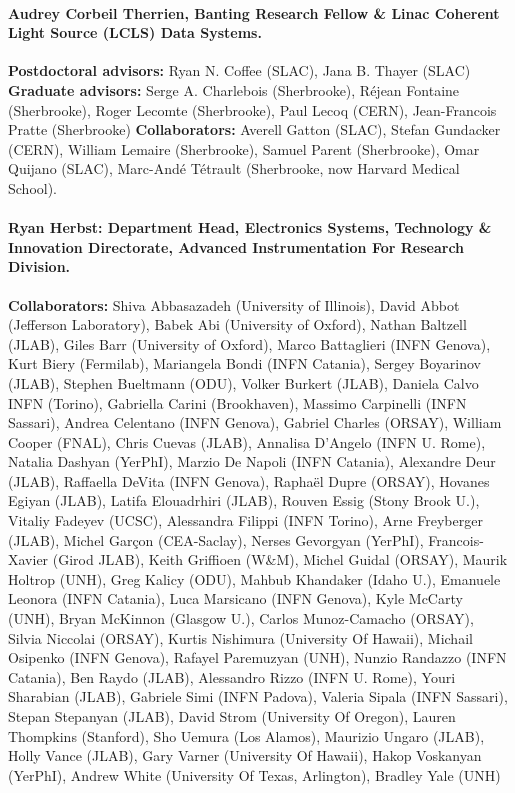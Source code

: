 \documentclass{article}
\begin{document}
\paragraph{Audrey Corbeil Therrien, Banting Research Fellow \& Linac Coherent Light Source (LCLS) Data Systems. }
\textbf{Postdoctoral advisors: } Ryan N. Coffee (SLAC), Jana B. Thayer (SLAC)
\textbf{Graduate advisors: } Serge A. Charlebois (Sherbrooke), R\'{e}jean Fontaine (Sherbrooke), Roger Lecomte (Sherbrooke), Paul Lecoq (CERN), Jean-Francois Pratte (Sherbrooke) 
\textbf{Collaborators: }
Averell Gatton (SLAC), Stefan Gundacker (CERN), William Lemaire (Sherbrooke), Samuel Parent (Sherbrooke), Omar Quijano (SLAC), Marc-And\'{e} T\'{e}trault (Sherbrooke, now Harvard Medical School).

\paragraph{Ryan Herbst: Department Head, Electronics Systems, Technology \& Innovation Directorate, Advanced Instrumentation For Research Division. }
\textbf{Collaborators: }
Shiva Abbasazadeh (University of Illinois), David	Abbot	(Jefferson Laboratory), Babek	Abi	(University of Oxford), Nathan	Baltzell	(JLAB), Giles	Barr	(University of Oxford), Marco	Battaglieri	(INFN Genova), Kurt	Biery	(Fermilab), Mariangela	Bondi	(INFN Catania), Sergey	Boyarinov	(JLAB), Stephen	Bueltmann	(ODU), Volker	Burkert	(JLAB), Daniela	Calvo	INFN (Torino), Gabriella	Carini	(Brookhaven), Massimo	Carpinelli	(INFN Sassari), Andrea	Celentano	(INFN Genova), Gabriel	Charles	(ORSAY), William	Cooper	(FNAL), Chris	Cuevas	(JLAB), Annalisa	D'Angelo	(INFN U. Rome), Natalia	Dashyan	(YerPhI), Marzio	De Napoli	(INFN Catania), Alexandre	Deur	(JLAB), Raffaella	DeVita	(INFN Genova), Raphaël	Dupre	(ORSAY), Hovanes	Egiyan	(JLAB), Latifa	Elouadrhiri	(JLAB), Rouven	Essig	(Stony Brook U.), Vitaliy	Fadeyev	(UCSC), Alessandra	Filippi	(INFN Torino), Arne	Freyberger	(JLAB), Michel	Garçon	(CEA-Saclay), Nerses	Gevorgyan	(YerPhI), Francois-Xavier	(Girod	JLAB), Keith	Griffioen	(W\&M), Michel	Guidal	(ORSAY), Maurik	Holtrop	(UNH), Greg	Kalicy	(ODU), Mahbub	Khandaker	(Idaho U.), Emanuele	Leonora	(INFN Catania), Luca	Marsicano	(INFN Genova), Kyle	McCarty	(UNH), Bryan	McKinnon	(Glasgow U.), Carlos	Munoz-Camacho	(ORSAY), Silvia	Niccolai	(ORSAY), Kurtis	Nishimura	(University Of Hawaii), Michail	Osipenko	(INFN Genova), Rafayel	Paremuzyan	(UNH), Nunzio	Randazzo	(INFN Catania), Ben	Raydo	(JLAB), Alessandro	Rizzo	(INFN U. Rome), Youri	Sharabian	(JLAB), Gabriele	Simi	(INFN Padova), Valeria	Sipala	(INFN Sassari), Stepan	Stepanyan	(JLAB), David	Strom	(University Of Oregon), Lauren	Thompkins	(Stanford), Sho	Uemura	(Los Alamos), Maurizio	Ungaro	(JLAB), Holly	Vance	(JLAB), Gary	Varner	(University Of Hawaii), Hakop	Voskanyan	(YerPhI), Andrew	White	(University Of Texas, Arlington), Bradley	Yale	(UNH)
\end{document}
